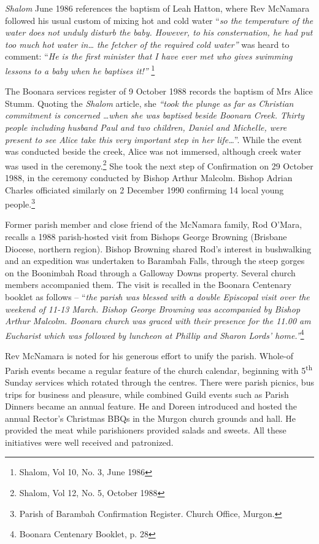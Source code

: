\emph{Shalom} June 1986 references the baptism of Leah Hatton, where Rev McNamara followed his usual custom of mixing hot and cold water ``\emph{so the temperature of the water does not unduly disturb the baby. However, to his consternation, he had put too much hot water in\ldots{} the fetcher of the required cold water''} was heard to comment: ``\emph{He is the first minister that I have ever met who gives swimming lessons to a baby when he baptises it!''} \footnote{Shalom, Vol 10, No. 3, June 1986}


The Boonara services register of 9 October 1988 records the baptism of Mrs Alice Stumm. Quoting the \emph{Shalom} article, she \emph{``took the plunge as far as Christian commitment is concerned \ldots when she was baptised beside Boonara Creek. Thirty people including husband Paul and two children, Daniel and Michelle, were present to see Alice take this very important step in her life\ldots{}}''. While the event was conducted beside the creek, Alice was not immersed, although creek water was used in the ceremony.\footnote{Shalom, Vol 12, No. 5, October 1988} She took the next step of Confirmation on 29 October 1988, in the ceremony conducted by Bishop Arthur Malcolm. Bishop Adrian Charles officiated similarly on 2 December 1990 confirming 14 local young people.\footnote{Parish of Barambah Confirmation Register. Church Office, Murgon.}


Former parish member and close friend of the McNamara family, Rod O'Mara, recalls a 1988 parish-hosted visit from Bishops George Browning (Brisbane Diocese, northern region). Bishop Browning shared Rod's interest in bushwalking and an expedition was undertaken to Barambah Falls, through the steep gorges on the Boonimbah Road through a Galloway Downs property. Several church members accompanied them. The visit is recalled in the Boonara Centenary booklet as follows -- ``\emph{the parish was blessed with a double Episcopal visit over the weekend of 11-13 March. Bishop George Browning was accompanied by Bishop Arthur Malcolm. Boonara church was graced with their presence for the 11.00 am Eucharist which was followed by luncheon at Phillip and Sharon Lords' home.''}\footnote{Boonara Centenary Booklet, p. 28}


Rev McNamara is noted for his generous effort to unify the parish. Whole-of Parish events became a regular feature of the church calendar, beginning with 5\textsuperscript{th} Sunday services which rotated through the centres. There were parish picnics, bus trips for business and pleasure, while combined Guild events such as Parish Dinners became an annual feature. He and Doreen introduced and hosted the annual Rector's Christmas BBQs in the Murgon church grounds and hall. He provided the meat while parishioners provided salads and sweets. All these initiatives were well received and patronized.



